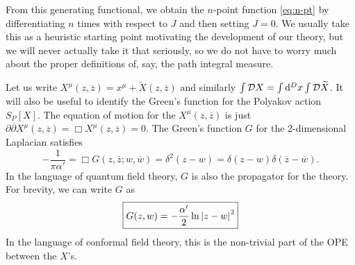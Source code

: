 
From this generating functional, we obtain the $n$-point function \eqref{eq:n-pt} by differentiating $n$ times with respect to $J$ and then setting $J =0$.
We usually take this as a heuristic starting point motivating the development of our theory, but we will never actually take it that seriously, so we do not have to worry much about the proper definitions of, say, the path integral measure.

Let us write $X^{\mu}(z, \overline{z}{}) = x^{\mu} + \widetilde{X}(z, \overline{z}{})$ and similarly $\int \mathop{\mathcal{D} X} = \int \dd[D]{x} \int \mathop{\mathcal{D} \widetilde{X}}$. It will also be useful to identify the Green's function for the Polyakov action $S_P[X]$.
The equation of motion for the $X^{\mu}(z, \overline{z}{})$ is just $\partial \overline{\partial}{} X^{\mu}(z, \overline{z}{}) = \Box X^{\mu}(z, \overline{z}{}) = 0$. The Green's function $G$ for the $2$-dimensional Laplacian satisfies
\begin{equation}
  -\frac{1}{\pi \alpha'} = \Box G(z, \overline{z}{}; w, \overline{w}{}) = \delta^2(z - w) = \delta(z - w) \delta(\overline{z}{} - \overline{w}{}).
\end{equation}
In the language of quantum field theory, $G$ is also the propagator for the theory.
For brevity, we can write $G$ as
\begin{equation}
  \boxed{G(z, w) = -\frac{\alpha'}{2} \ln \abs{z - w}^2}
\end{equation}
In the language of conformal field theory, this is the non-trivial part of the OPE between the $X$'s.

